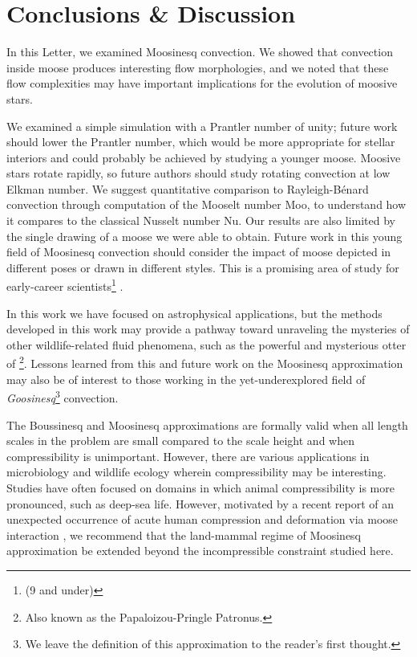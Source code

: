 \section{Conclusions \& Discussion}
\label{sec:conclusions}

In this Letter, we examined Moosinesq convection.
We showed that convection inside moose produces interesting flow morphologies, and we noted that these flow complexities may have important implications for the evolution of moosive stars.

We examined a simple simulation with a Prantler number of unity; future work should lower the Prantler number, which would be more appropriate for stellar interiors \citep{garaud_2021} and could probably be achieved by studying a younger moose.
Moosive stars rotate rapidly, so future authors should study rotating convection at low Elkman number.
We suggest quantitative comparison to Rayleigh-B\'{e}nard convection through computation of the Mooselt number Moo, to understand how it compares to the classical Nusselt number Nu.
Our results are also limited by the single drawing of a moose we were able to obtain.
Future work in this young field of Moosinesq convection should consider the impact of moose depicted in different poses or drawn in different styles.
This is a promising area of study for early-career scientists\footnote{(9 and under)} \cite[see e.g.,][Fig.~9]{luger_etal_2019}.

In this work we have focused on astrophysical applications, but the methods developed in this work may provide a pathway toward unraveling the mysteries of other wildlife-related fluid phenomena, such as the powerful and mysterious otter of \cite{Schwab2021}\footnote{Also known as the Papaloizou-Pringle Patronus.}.
Lessons learned from this and future work on the Moosinesq approximation may also be of interest to those working in the yet-underexplored field of \textit{Goosinesq}\footnote{We leave the definition of this approximation to the reader's first thought.} convection.

The Boussinesq and Moosinesq approximations are formally valid when all length scales in the problem are small compared to the scale height and when compressibility is unimportant.
However, there are various applications in microbiology \citep[e.g.][]{Ravetto2014} and wildlife ecology \citep[e.g.][]{Enright1963} wherein compressibility may be interesting.
Studies have often focused on domains in which animal compressibility is more pronounced, such as deep-sea life.
However, motivated by a recent report of an unexpected occurrence of acute human compression and deformation via moose interaction \citep{Gudmannsson2018}, we recommend that the land-mammal regime of Moosinesq approximation be extended beyond the incompressible constraint studied here.


